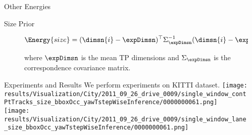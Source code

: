 \documentclass[handout,final]{beamer}
\newlength{\sepwid}
\newlength{\onecolwid}
\begin{document}
\begin{frame}[t]
\begin{columns}[t]
\begin{column}{\onecolwid}
\begin{block}{Other Energies}
\begin{description}
          \item[Size Prior]
            \begin{align}
              \label{eq:totalSizeEnergy}
              \Energy{size} &= (\dimsn{i} - \expDimsn)^\top\Sigma_{\expDimsn}^{-1}(\dimsn{i} -
              \expDimsn)
            \end{align}

            where $\expDimsn$ is the mean TP dimensions and
            $\Sigma_{\expDimsn}$ is the correspondence covariance matrix.

        \end{description}
      \end{block}
      \begin{block}{Experiments and Results}
        We perform experiments on KITTI \cite{geiger2013vision} dataset.
        \texttt{[image: results/Visualization/City/2011\_09\_26\_drive\_0009/single\_window\_contPtTracks\_size\_bboxOcc\_yawTstepWiseInference/0000000061.png]}\\
        \texttt{[image: results/Visualization/City/2011\_09\_26\_drive\_0009/single\_window\_lane\_size\_bboxOcc\_yawTstepWiseInference/0000000061.png]}\\

        
      \end{block}
    \end{column}

  \begin{column}{\sepwid}\end{column}			%


\end{columns}
\end{frame}
\end{document}
